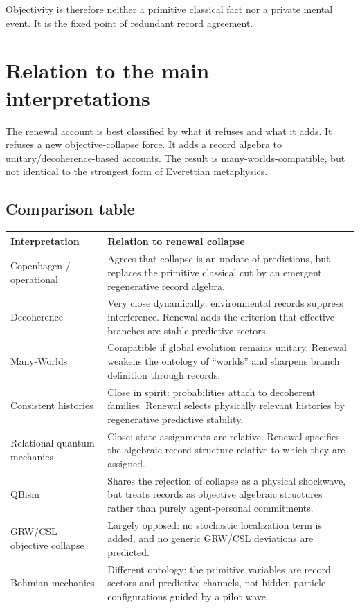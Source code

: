 \documentclass[11pt]{article}
\numberwithin{equation}{section}
\theoremstyle{definition}
\theoremstyle{remark}
\begin{document}
Objectivity is therefore neither a primitive classical fact nor a private mental event.  It is the fixed point of redundant record agreement.

\section{Relation to the main interpretations}
\label{sec:interpretations}

The renewal account is best classified by what it refuses and what it adds.  It refuses a new objective-collapse force.  It adds a record algebra to unitary/decoherence-based accounts.  The result is many-worlds-compatible, but not identical to the strongest form of Everettian metaphysics.

\subsection{Comparison table}

\begin{center}
\small
\renewcommand{\arraystretch}{1.15}
\begin{tabularx}{\textwidth}{@{}p{}X@{}}
\toprule
\textbf{Interpretation} & \textbf{Relation to renewal collapse}\\
\midrule
Copenhagen / operational & Agrees that collapse is an update of predictions, but replaces the primitive classical cut by an emergent regenerative record algebra.\\
Decoherence & Very close dynamically: environmental records suppress interference.  Renewal adds the criterion that effective branches are stable predictive sectors.\\
Many-Worlds & Compatible if global evolution remains unitary.  Renewal weakens the ontology of ``worlds'' and sharpens branch definition through records.\\
Consistent histories & Close in spirit: probabilities attach to decoherent families.  Renewal selects physically relevant histories by regenerative predictive stability.\\
Relational quantum mechanics & Close: state assignments are relative.  Renewal specifies the algebraic record structure relative to which they are assigned.\\
QBism & Shares the rejection of collapse as a physical shockwave, but treats records as objective algebraic structures rather than purely agent-personal commitments.\\
GRW/CSL objective collapse & Largely opposed: no stochastic localization term is added, and no generic GRW/CSL deviations are predicted.\\
Bohmian mechanics & Different ontology: the primitive variables are record sectors and predictive channels, not hidden particle configurations guided by a pilot wave.\\
\bottomrule
\end{tabularx}
\end{center}
\end{document}
